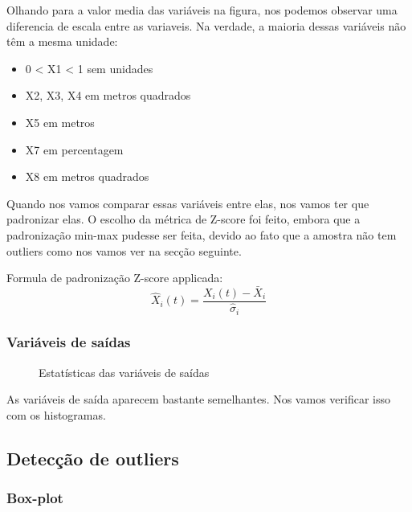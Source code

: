 \documentclass[paper=a4, fontsize=11pt]{article} %
\numberwithin{equation}{section} %
\numberwithin{figure}{section} %
\numberwithin{table}{section} %
\begin{document}
Olhando para a valor media das variáveis na figura, nos podemos observar uma diferencia de escala entre as variaveis.
Na verdade, a maioria dessas variáveis não têm a mesma unidade:
\begin{itemize}
\item 0 < X1 < 1 sem unidades
\item X2, X3, X4 em metros quadrados
\item X5 em metros
\item X7 em percentagem
\item X8 em metros quadrados
\end{itemize}

Quando nos vamos comparar essas variáveis entre elas, nos vamos ter que padronizar elas.
O escolho da métrica de Z-score foi feito, embora que a padronização min-max pudesse ser feita,
devido ao fato que a amostra não tem outliers como nos vamos ver na secção seguinte.

Formula de padronização Z-score applicada:
\begin{equation}
\hat{X}_{i}(t) = \frac{X_{i}(t) - \bar{X}_{i}}{\hat{\sigma}_{i}}
\end{equation}

\subsubsection{Variáveis de saídas}

  \begin{figure}[H] %
  \begin{center}
  \end{center}
  \caption{Estatísticas das variáveis de saídas}
  \label{statis_Y}
  \end{figure}

As variáveis de saída aparecem bastante semelhantes. Nos vamos verificar isso com os histogramas.


\subsection{Detecção de outliers}

\subsubsection{Box-plot}
\end{document}
